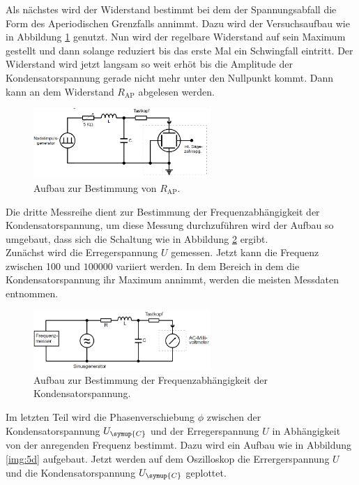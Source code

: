 \noindent Als nächstes wird der Widerstand bestimmt bei dem der Spannungsabfall die Form des Aperiodischen Grenzfalls annimmt. Dazu wird der 
Versuchsaufbau wie in Abbildung \ref{img:5b} genutzt. Nun wird der regelbare Widerstand auf sein Maximum gestellt und dann solange reduziert bis
das erste Mal ein Schwingfall eintritt. Der Widerstand wird jetzt langsam so weit erhöt bis die Amplitude der Kondensatorspannung gerade nicht mehr 
unter den Nullpunkt kommt. Dann kann an dem Widerstand $R_{\text{AP}}$ abgelesen werden.

\begin{figure}[H]
    \centering
    \includegraphics[width=0.6\textwidth]{images/5b.PNG}
    \caption{Aufbau zur Bestimmung von $R_{\text{AP}}$\protect \cite{V354}.}
    \label{img:5b}
\end{figure}


\noindent Die dritte Messreihe dient zur Bestimmung der Frequenzabhängigkeit der Kondensatorspannung, um diese Messung durchzuführen wird der 
Aufbau so umgebaut, dass sich die Schaltung wie in Abbildung \ref{img:5c} ergibt.\\
Zunächst wird die Erregerspannung $U$ gemessen. Jetzt kann die 
Frequenz zwischen 100 und $\num{100000}$ variiert werden. In dem Bereich in dem die Kondensatorspannung ihr Maximum annimmt, werden die 
meisten Messdaten entnommen.

\begin{figure}[H]
    \centering
    \includegraphics[width=0.6\textwidth]{images/5c.PNG}
    \caption{Aufbau zur Bestimmung der Frequenzabhängigkeit der Kondensatorspannung\protect \cite{V354}.}
    \label{img:5c}
\end{figure}

\noindent Im letzten Teil wird die Phasenverschiebung $\phi$ zwischen der Kondensatorspannung $U_{\symup{C}}$ und der Erregerspannung $U$ in 
Abhängigkeit von der anregenden Frequenz bestimmt. Dazu wird ein Aufbau wie in Abbildung \ref{img:5d} aufgebaut. Jetzt werden auf dem Oszilloskop
die Errergerspannung $U$ und die Kondensatorspannung $U_{\symup{C}}$ geplottet. 

